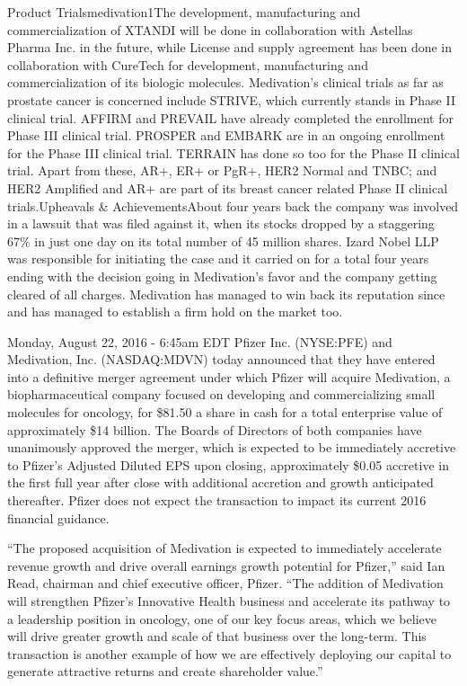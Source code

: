 \documentclass[letterpaper,12pt,english]{sphinxmanual}
\begin{document}
Product Trialsmedivation1The development, manufacturing and commercialization of XTANDI will be done in collaboration with Astellas Pharma Inc. in the future, while License and supply agreement has been done in collaboration with CureTech for development, manufacturing and commercialization of its biologic molecules. Medivation’s clinical trials as far as prostate cancer is concerned include STRIVE, which currently stands in Phase II clinical trial. AFFIRM and PREVAIL have already completed the enrollment for Phase III clinical trial. PROSPER and EMBARK are in an ongoing enrollment for the Phase III clinical trial. TERRAIN has done so too for the Phase II clinical trial. Apart from these, AR+, ER+ or PgR+, HER2 Normal and TNBC; and HER2 Amplified and AR+ are part of its breast cancer related Phase II clinical trials.Upheavals \& AchievementsAbout four years back the company was involved in a lawsuit that was filed against it, when its stocks dropped by a staggering 67\% in just one day on its total number of 45 million shares. Izard Nobel LLP was responsible for initiating the case and it carried on for a total four years ending with the decision going in Medivation’s favor and the company getting cleared of all charges. Medivation has managed to win back its reputation since and has managed to establish a firm hold on the market too.

Monday, August 22, 2016 - 6:45am
EDT
Pfizer Inc. (NYSE:PFE) and Medivation, Inc. (NASDAQ:MDVN) today announced that they have entered into a definitive merger agreement under which Pfizer will acquire Medivation, a biopharmaceutical company focused on developing and commercializing small molecules for oncology, for \$81.50 a share in cash for a total enterprise value of approximately \$14 billion. The Boards of Directors of both companies have unanimously approved the merger, which is expected to be immediately accretive to Pfizer’s Adjusted Diluted EPS upon closing, approximately \$0.05 accretive in the first full year after close with additional accretion and growth anticipated thereafter. Pfizer does not expect the transaction to impact its current 2016 financial guidance.

“The proposed acquisition of Medivation is expected to immediately accelerate revenue growth and drive overall earnings growth potential for Pfizer,” said Ian Read, chairman and chief executive officer, Pfizer. “The addition of Medivation will strengthen Pfizer’s Innovative Health business and accelerate its pathway to a leadership position in oncology, one of our key focus areas, which we believe will drive greater growth and scale of that business over the long-term. This transaction is another example of how we are effectively deploying our capital to generate attractive returns and create shareholder value.”
\end{document}
